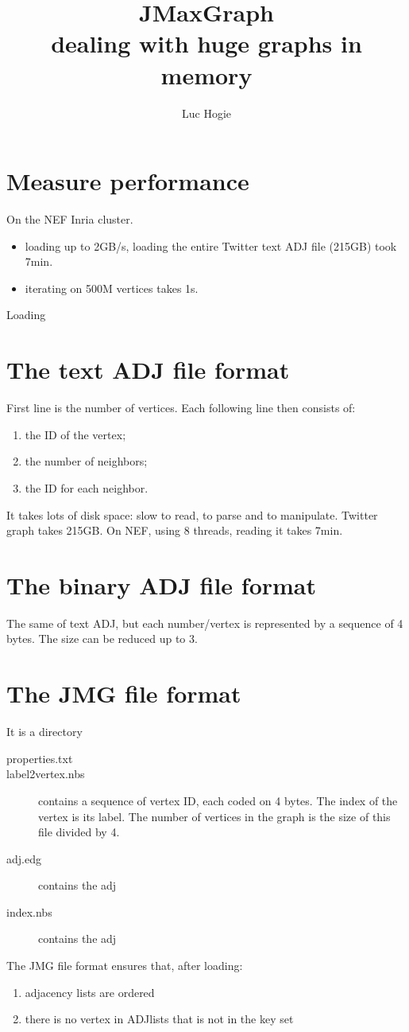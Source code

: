 \documentclass[11pt,a4paper]{article}
\title{JMaxGraph\\ dealing with huge graphs in memory}
\author{Luc Hogie}
\begin{document}
\section{Measure performance}
On the NEF Inria cluster.
\begin{itemize}
\item loading up to 2GB/s, loading the entire Twitter text ADJ file (215GB) took 7min.
\item iterating on 500M vertices takes 1s.
\end{itemize}
Loading
\section{The text ADJ file format}
First line is the number of vertices. Each following line then consists of:
\begin{enumerate}
\item the ID of the vertex;
\item the number of neighbors;
\item the ID for each neighbor.
\end{enumerate}
It takes lots of disk space: slow to read, to parse and to manipulate.
Twitter graph takes 215GB. 
On NEF, using 8 threads, reading it takes 7min.

\section{The binary ADJ file format}
The same of text ADJ, but each number/vertex is represented by a sequence of 4 bytes.
The size can be reduced up to 3.
\section{The JMG file format}
It is a directory
\begin{description}
\item[properties.txt] 
\item[label2vertex.nbs] contains a sequence of vertex ID, each coded on 4 bytes. The index of the vertex is its label. The number of vertices in the graph is the size of this file divided by 4.
\item[adj.edg] contains the adj
\item[index.nbs] contains the adj
 \end{description}
The JMG file format ensures that, after loading:
\begin{enumerate}
\item adjacency lists are ordered
\item there is no vertex in ADJlists that is not in the key set
\end{enumerate}
\end{document}
